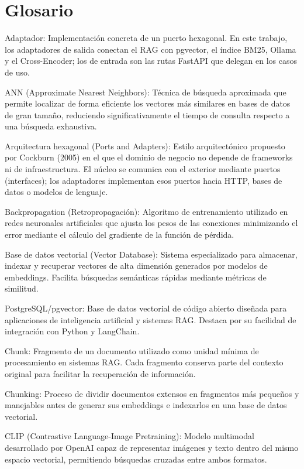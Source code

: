 \chapter{Glosario}

Adaptador: Implementación concreta de un puerto hexagonal. En este trabajo, los adaptadores de salida conectan el RAG con pgvector, el índice BM25, Ollama y el Cross-Encoder; los de entrada son las rutas FastAPI que delegan en los casos de uso.

ANN (Approximate Nearest Neighbors): Técnica de búsqueda aproximada que permite localizar de forma eficiente los vectores más similares en bases de datos de gran tamaño, reduciendo significativamente el tiempo de consulta respecto a una búsqueda exhaustiva.

Arquitectura hexagonal (Ports and Adapters): Estilo arquitectónico propuesto por Cockburn (2005) en el que el dominio de negocio no depende de frameworks ni de infraestructura. El núcleo se comunica con el exterior mediante puertos (interfaces); los adaptadores implementan esos puertos hacia HTTP, bases de datos o modelos de lenguaje.

Backpropagation (Retropropagación): Algoritmo de entrenamiento utilizado en redes neuronales artificiales que ajusta los pesos de las conexiones minimizando el error mediante el cálculo del gradiente de la función de pérdida.

Base de datos vectorial (Vector Database): Sistema especializado para almacenar, indexar y recuperar vectores de alta dimensión generados por modelos de embeddings. Facilita búsquedas semánticas rápidas mediante métricas de similitud.

PostgreSQL/pgvector: Base de datos vectorial de código abierto diseñada para aplicaciones de inteligencia artificial y sistemas RAG. Destaca por su facilidad de integración con Python y LangChain.

Chunk: Fragmento de un documento utilizado como unidad mínima de procesamiento en sistemas RAG. Cada fragmento conserva parte del contexto original para facilitar la recuperación de información.

Chunking: Proceso de dividir documentos extensos en fragmentos más pequeños y manejables antes de generar sus embeddings e indexarlos en una base de datos vectorial.

CLIP (Contrastive Language-Image Pretraining): Modelo multimodal desarrollado por OpenAI capaz de representar imágenes y texto dentro del mismo espacio vectorial, permitiendo búsquedas cruzadas entre ambos formatos.

